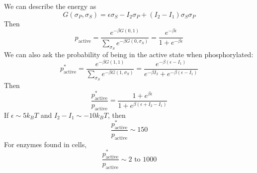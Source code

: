 \documentclass[a4paper,twoside,master.tex]{subfiles}
\begin{document}
\begin{ex}
    We can describe the energy as
    \begin{equation}
        G(\sigma_P, \sigma_S) = \epsilon \sigma_S - I_2 \sigma_P + (I_2 - I_1) \sigma_S \sigma_P
    \end{equation}
    Then
    \begin{equation}
        p_{\text{active}} = \frac{e^{- \beta G(0,1)}}{\sum_{\sigma_S} e^{- \beta G(0, \sigma_S)}} = \frac{e^{- \beta \epsilon}}{1 + e^{- \beta \epsilon}}
    \end{equation}
    We can also ask the probability of being in the active state when phosphorylated:
    \begin{equation}
        p^*_{\text{active}} = \frac{e^{- \beta G(1,1)}}{\sum_{\sigma_S} e^{- \beta G(1, \sigma_S)}} = \frac{e^{- \beta (\epsilon - I_1)}}{e^{- \beta I_2} + e^{- \beta (\epsilon - I_1)}}
    \end{equation}
    Then
    \begin{equation}
        \frac{p^*_{\text{active}}}{p_{\text{active}}} = \frac{1 + e^{\beta \epsilon}}{1 + e^{\beta (\epsilon + I_2 - I_1)}}
    \end{equation}
    If $ \epsilon \sim 5 k_B T $ and $ I_2 - I_1 \sim - 10 k_B T $, then
    \begin{equation}
        \frac{p^*_{\text{active}}}{p_{\text{active}}} \sim 150
    \end{equation}
    For enzymes found in cells,
    \begin{equation}
        \frac{p^*_{\text{active}}}{p_{\text{active}}} \sim 2\text{ to }1000
    \end{equation}
\end{ex}
\end{document}
